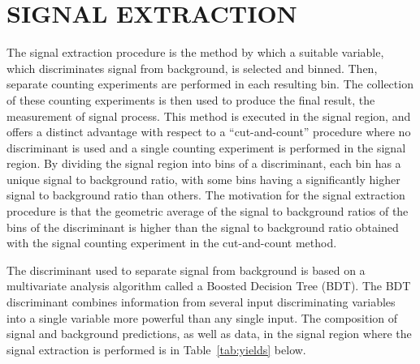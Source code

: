 %
%

\chapter{SIGNAL EXTRACTION}
\label{chap:extraction}
The signal extraction procedure is the method by which a suitable variable, which discriminates signal
from background, is selected and binned. Then, separate counting experiments are performed in each
resulting bin. The collection of these counting experiments is then used to produce the final
result, the measurement of \tth signal process. This method is executed in the signal region, and offers
a distinct advantage with respect to a ``cut-and-count'' procedure where no discriminant is used and 
a single counting experiment is performed in the signal region.
By dividing the signal region into bins of a discriminant, each bin has a unique
signal to background ratio, with some bins having a significantly higher signal to background ratio
than others. The motivation for the signal extraction procedure is that the geometric average of the
signal to background ratios of the bins of the discriminant is higher than the signal to background ratio
obtained with the signal counting experiment in the cut-and-count method. 

The discriminant used to separate signal from background is based on a multivariate analysis algorithm 
called a Boosted Decision Tree (BDT). The BDT discriminant combines information from several input discriminating
variables into a single variable more powerful than any single input. 
The composition of signal and background predictions, as well as data, in the signal region where the
signal extraction is performed is in Table~\ref{tab:yields} below.

